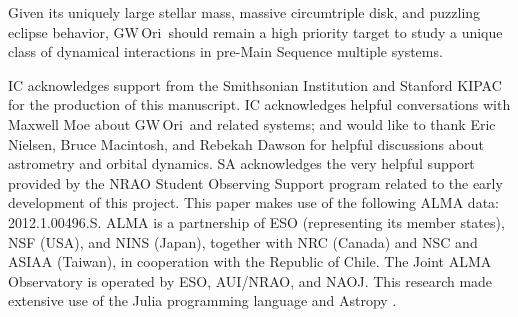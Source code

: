 \documentclass[twocolumn]{aastex61}
\newcommand{\obj}{GW\,Ori}
\begin{document}
Given its uniquely large stellar mass, massive circumtriple disk, and puzzling eclipse behavior, \obj\ should remain a high priority target to study a unique class of dynamical interactions in pre-Main Sequence multiple systems.

\acknowledgments
IC acknowledges support from the Smithsonian Institution and Stanford KIPAC for the production of this manuscript. IC acknowledges helpful conversations with Maxwell Moe about \obj\ and related systems; and would like to thank Eric Nielsen, Bruce Macintosh, and Rebekah Dawson for helpful discussions about astrometry and orbital dynamics. SA acknowledges the very helpful support provided by the NRAO Student Observing Support program related to the early development of this project.  This paper makes use of the following ALMA data: 2012.1.00496.S. ALMA is a partnership of ESO (representing its member states), NSF (USA), and NINS (Japan), together with NRC (Canada) and NSC and ASIAA (Taiwan), in cooperation with the Republic of Chile.  The Joint ALMA Observatory is operated by ESO, AUI/NRAO, and NAOJ.  This research made extensive use of the Julia programming language \citep{bezanson17} and Astropy \citep{astropy13}.




\end{document}
